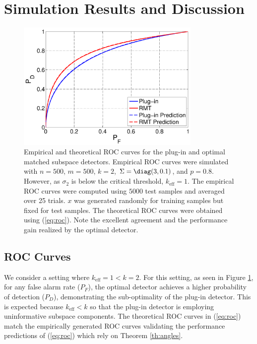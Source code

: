 \section{Simulation Results and Discussion}\label{sec:results}

\begin{figure}[t]
\centering
\includegraphics[width=3.5in]{figures/basic_roc.pdf}
\caption{Empirical and theoretical ROC curves for the plug-in and optimal matched subspace detectors. Empirical ROC curves were simulated with $n=500$, $m=500$, $k=2$, $\Sigma=\diag(3,0.1)$, and $p=0.8$. However, as $\sigma_2$ is below the critical threshold, $k_{\text{eff}} = 1$. The empirical ROC curves were computed using $5000$ test samples and averaged over 25 trials. $x$ was generated randomly for training samples but fixed for test samples. The theoretical ROC curves were obtained using (\ref{eq:roc}). Note the excellent agreement and the performance gain realized by the optimal detector.}\vskip-0.45cm
\label{fig:roc1}
\end{figure}


\subsection{ROC Curves}

We consider a setting where $k_{\text{eff}} = 1 < k = 2$. For this setting, as seen in Figure \ref{fig:roc1}, for any false alarm rate ($P_F$), the optimal detector achieves a higher probability of detection ($P_D$), demonstrating the sub-optimality of the plug-in detector. This is expected because $k_\text{eff}<k$ so that the plug-in detector is employing uninformative subspace components. The theoretical ROC curves in (\ref{eq:roc}) match the empirically generated ROC curves validating the performance predictions of (\ref{eq:roc}) which rely on Theorem \ref{th:angles}.

